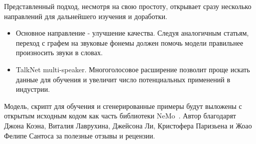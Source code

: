 Представленный подход, несмотря на свою простоту, открывает сразу несколько направлений для дальнейшего изучения и доработки.
\begin{itemize}
    \item Основное направление - улучшение качества. Следуя аналогичным статьям, переход с графем на звуковые фонемы должен помочь модели правильнее произносить звуки в словах.
    \item TalkNet multi-speaker. Многоголосовое расширение позволит проще искать данные для обучения и увеличит число потенциальных применений в индустрии.
\end{itemize}

Модель, скрипт для обучения и сгенерированные примеры будут выложены с открытым исходным кодом как часть библиотеки NeMo~\cite{nemo}. Автор благодарят Джона Коэна, Виталия Лаврухина, Джейсона Ли, Кристофера Паризьена и Жоао Фелипе Сантоса за полезные отзывы и рецензии.